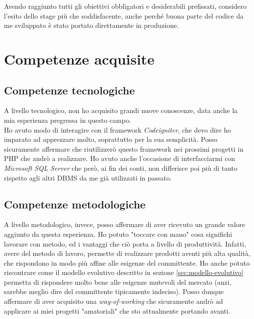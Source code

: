 Avendo raggiunto tutti gli obiettivi obbligatori e desiderabili prefissati, considero l'esito dello stage più che soddisfacente, anche perché buona parte del codice da me sviluppato è stato portato direttamente in produzione.
\section{Competenze acquisite}
\subsection{Competenze tecnologiche}
A livello tecnologico, non ho acquisito grandi nuove conoscenze, data anche la mia esperienza pregressa in questo campo.\\ Ho avuto modo di interagire con il framework \textit{Codeigniter}, che devo dire ho imparato ad apprezzare molto, soprattutto per la sua semplicità. Posso sicuramente affermare che riutilizzerò questo framework nei prossimi progetti in PHP che andrò a realizzare. Ho avuto anche l'occasione di interfacciarmi con \textit{Microsoft SQL Server} che però, ai fin dei conti, non differisce poi più di tanto rispetto agli altri \gls{DBMS} da me già utilizzati in passato.
\subsection{Competenze metodologiche}
A livello metodologico, invece, posso affermare di aver ricevuto un grande valore aggiunto da questa esperienza. Ho potuto "toccare con mano" cosa significhi lavorare con metodo, ed i vantaggi che ciò porta a livello di produttività. Infatti, avere del metodo di lavoro, permette di realizzare prodotti aventi più alta qualità, che rispondono in modo più affine alle esigenze del committente. Ho anche potuto riscontrare come il modello evolutivo descritto in sezione \ref{sec:modello-evolutivo} permetta di rispondere molto bene alle esigenze mutevoli del mercato (anzi, sarebbe meglio dire del committente tipicamente indeciso). Posso dunque affermare di aver acquisito una \textit{way-of-working} che sicuramente andrò ad applicare ai miei progetti "amatoriali" che sto attualmente portando avanti.
